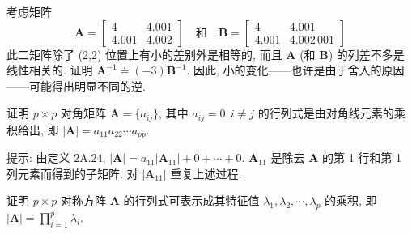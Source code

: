 \medskip
{}\quad 考虑矩阵
\[
\mathbf{A}=\begin{bmatrix}4&4.001\\4.001&4.002\end{bmatrix}\quad\text{和}\quad
\mathbf{B}=\begin{bmatrix}4&4.001\\4.001&4.002\,001\end{bmatrix}
\]
此二矩阵除了 (2,2) 位置上有小的差别外是相等的, 而且 $\mathbf{A}$ (和 $\mathbf{B}$) 的列差不多是线性相关的. 证明 $\mathbf{A}^{-1}\doteq(-3)\mathbf{B}^{-1}$. 因此, 小的变化——也许是由于舍入的原因——可能得出明显不同的逆.

\medskip
{}\quad 证明 $p\times p$ 对角矩阵 $\mathbf{A}=\{a_{ij}\}$, 其中 $a_{ij}=0, i\ne j$ 的行列式是由对角线元素的乘积给出, 即 $|\mathbf{A}|=a_{11}a_{22}\cdots a_{pp}$.

\noindent 提示: 由定义 2A.24, $|\mathbf{A}|=a_{11}|\mathbf{A}_{11}|+0+\cdots+0$. $\mathbf{A}_{11}$ 是除去 $\mathbf{A}$ 的第 1 行和第 1 列元素而得到的子矩阵. 对 $|\mathbf{A}_{11}|$ 重复上述过程.

\medskip
{}\quad 证明 $p\times p$ 对称方阵 $\mathbf{A}$ 的行列式可表示成其特征值 $\lambda_{1},\lambda_{2},\cdots,\lambda_{p}$ 的乘积, 即 $|\mathbf{A}|=\prod_{i=1}^{p}\lambda_{i}$.
